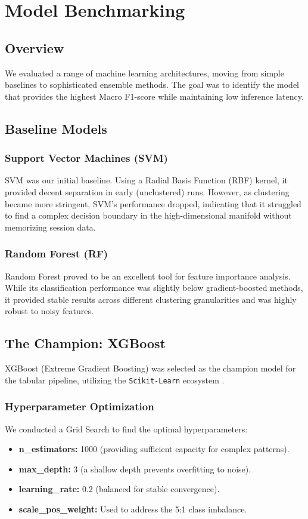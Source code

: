 \chapter{Model Benchmarking}

\section{Overview}
We evaluated a range of machine learning architectures, moving from simple baselines to sophisticated ensemble methods. The goal was to identify the model that provides the highest Macro F1-score while maintaining low inference latency.

\section{Baseline Models}

\subsection{Support Vector Machines (SVM)}
SVM was our initial baseline. Using a Radial Basis Function (RBF) kernel, it provided decent separation in early (unclustered) runs. However, as clustering became more stringent, SVM's performance dropped, indicating that it struggled to find a complex decision boundary in the high-dimensional manifold without memorizing session data.

\subsection{Random Forest (RF)}
Random Forest proved to be an excellent tool for feature importance analysis. While its classification performance was slightly below gradient-boosted methods, it provided stable results across different clustering granularities and was highly robust to noisy features.

\section{The Champion: XGBoost}
XGBoost (Extreme Gradient Boosting) \cite{xgboost2016} was selected as the champion model for the tabular pipeline, utilizing the \texttt{Scikit-Learn} ecosystem \cite{scikit2011}. 

\subsection{Hyperparameter Optimization}
We conducted a Grid Search to find the optimal hyperparameters:
\begin{itemize}
    \item \textbf{n\_estimators:} 1000 (providing sufficient capacity for complex patterns).
    \item \textbf{max\_depth:} 3 (a shallow depth prevents overfitting to noise).
    \item \textbf{learning\_rate:} 0.2 (balanced for stable convergence).
    \item \textbf{scale\_pos\_weight:} Used to address the 5:1 class imbalance.
\end{itemize}


